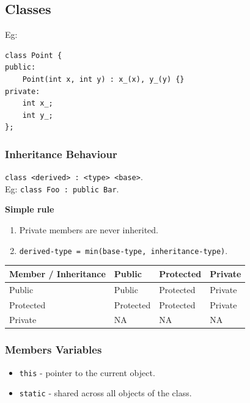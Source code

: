 \subsection{Classes}

Eg:
\begin{mdframed}[nobreak=true,backgroundcolor=gray!10,linecolor=Firebrick4]
\begin{verbatim}
class Point {
public:
    Point(int x, int y) : x_(x), y_(y) {}
private:
    int x_;
    int y_;
};
\end{verbatim}
\end{mdframed}

\subsubsection{Inheritance Behaviour}
\texttt{class <derived> : <type> <base>}.\\
Eg: \texttt{class Foo : public Bar}.\\
\begin{mdframed}[nobreak=true,backgroundcolor=SlateGray2!40,linecolor=Firebrick4]
\textbf{Simple rule}
\begin{enumerate}
\item Private members are never inherited.
\item \texttt{derived-type = min(base-type, inheritance-type)}.
\end{enumerate}
\end{mdframed}

\begin{tabular}{|l|l|l|l|}
\hline
Member / Inheritance & Public    & Protected & Private \\ \hline
Public               & Public    & Protected & Private \\ \hline
Protected            & Protected & Protected & Private \\ \hline
Private              & NA        & NA        & NA      \\ \hline 
\end{tabular}

\subsubsection{Members Variables}

\begin{itemize}
\item \texttt{this} - pointer to the current object.
\item \texttt{static} - shared across all objects of the class.
\end{itemize}




